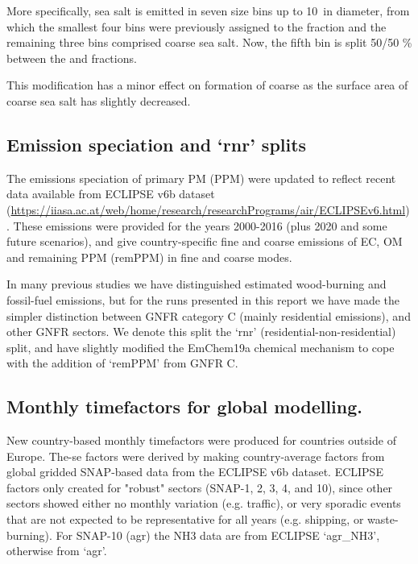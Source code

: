 More specifically, sea salt is emitted in seven size bins up to 10~\um in diameter, from which the smallest four bins were previously assigned to the \PM[2.5] fraction and the remaining three bins comprised coarse sea salt. Now, the fifth bin is split 50/50 \% between the \PM[2.5] and \PM[2.5-10] fractions.  


This modification has a minor effect on formation of coarse  as the surface area of coarse sea salt has slightly decreased.



\subsection{Emission speciation and `rnr' splits}
\label{ssec:emissplits}

The emissions speciation of primary PM (PPM) were updated
to reflect recent data available from
ECLIPSE v6b dataset
(\url{https://iiasa.ac.at/web/home/research/researchPrograms/air/ECLIPSEv6.html}).
These emissions were provided for the years 2000-2016 (plus 2020 and some future
scenarios), and give country-specific fine and coarse emissions of EC, OM and remaining
PPM (remPPM) in fine and coarse modes.

In many previous studies we have distinguished estimated wood-burning and
fossil-fuel emissions, but for the runs presented in this report we
have made the simpler distinction between GNFR category C (mainly
residential emissions), and other GNFR sectors.  We denote this
split the `rnr' (residential-non-residential) split, and have slightly
modified the EmChem19a chemical mechanism to cope with the addition
of `remPPM' from GNFR C.

\subsection{Monthly timefactors for global modelling.}
\label{ssec:monthlyFacs}

New country-based monthly timefactors were produced for countries outside of Europe. The\hyp{}se factors were derived by making country-average factors from global gridded SNAP-based data from the ECLIPSE v6b dataset. ECLIPSE factors only created for "robust" sectors (SNAP-1, 2, 3, 4, and 10), since other sectors showed either no monthly variation (e.g. traffic), or very sporadic events that are not expected to be representative for all years (e.g. shipping, or waste-burning). For SNAP-10 (agr) the NH3 data are from ECLIPSE `agr\_NH3', otherwise from `agr'.



